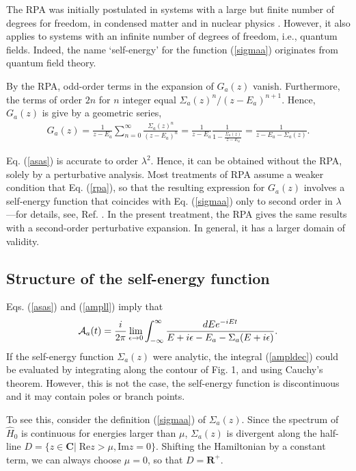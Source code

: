 \documentclass[12pt]{article}
\numberwithin{equation}{section}
\begin{document}
  The RPA was initially postulated in systems with  a large but finite number of degrees for freedom, in condensed matter \cite{BohmPi, GeBr} and
in nuclear physics \cite{Bloch, Nami}. However, it  also applies to systems with an infinite number of degrees of freedom, i.e., quantum fields.  Indeed, the name `self-energy'  for the function (\ref{sigmaa}) originates from quantum field theory.





By the RPA,     odd-order terms in the expansion of $G_a(z)$  vanish. Furthermore, the terms of order $2n$ for $n$ integer equal $\Sigma_a(z)^n/(z-E_a)^{n+1}$. Hence, $G_a(z)$ is give by  a geometric series,
\begin{eqnarray}
G_a(z) = \frac{1}{z-E_a} \sum_{n=0}^{\infty} \frac{\Sigma_a(z)^n}{(z-E_a)^n} = \frac{1}{z-E_a} \frac{1}{1 - \frac{\Sigma_a(z)}{z-E_a}} = \frac{1}{z - E_a - \Sigma_a(z)}. \label{asas}
\end{eqnarray}

 Eq. (\ref{asas}) is accurate to order $\lambda^2$. Hence, it can be obtained without the RPA, solely by a perturbative analysis. Most treatments of RPA assume a weaker condition that Eq. (\ref{rpa}), so that the resulting expression for  $G_a(z)$ involves a  self-energy function that coincides with Eq. (\ref{sigmaa}) only to second order in $\lambda$---for details, see,   Ref. \cite{NNP96}. In the present treatment, the RPA gives the same results with a second-order perturbative expansion. In general, it has a larger domain of validity.


\subsection{Structure of the self-energy function}
Eqs. (\ref{asas}) and (\ref{ampll}) imply that
\begin{eqnarray}
{\cal A}_a(t) = \frac{i}{2 \pi  } \lim_{\epsilon \rightarrow 0} \int_{-\infty }^{\infty } \frac{dE e^{-iEt}}{E + i \epsilon- E_a - \Sigma_a(E+i\epsilon)}. \label{ampldec}
\end{eqnarray}
If the self-energy function $\Sigma_a(z)$ were analytic, the integral (\ref{ampldec}) could be evaluated by integrating     along the contour of Fig. 1, and using Cauchy's theorem. However, this is not the case, the self-energy function is discontinuous and it may contain poles or branch points.

To see this, consider the definition     (\ref{sigmaa}) of  $\Sigma_a(z)$. Since the spectrum of $\hat{H}_0$ is continuous for energies larger than $\mu$, $\Sigma_a(z)$ is
     divergent along the half-line $D = \{ z \in {\pmb C}|\; \mbox{Re} z > \mu, \mbox{Im}z = 0\}$. Shifting the Hamiltonian by a constant term, we can always choose    $\mu = 0$, so that $D = {\pmb R}^+$.
\end{document}
